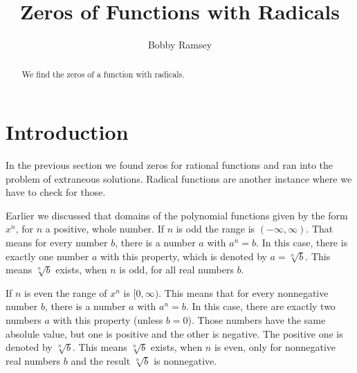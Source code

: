\documentclass[nooutcomes]{ximera}
\author{Bobby Ramsey}
\title{Zeros of Functions with Radicals}
\begin{document}
\begin{abstract}
 	We find the zeros of a function with radicals.
\end{abstract}
\maketitle




\section{Introduction}

	In the previous section we found zeros for rational functions and ran into the problem of extraneous solutions. 
	Radical functions are another instance where we have to check for those.

	\begin{callout}
		Earlier we discussed that domains of the polynomial functions given by the form $x^n$, for $n$ a positive, whole number.
		If $n$ is odd the range is $(-\infty, \infty)$. That means for every number $b$, there is a number $a$ with $a^n = b$. In this case,
		there is exactly one number $a$ with this property, which is denoted by $a = \sqrt[n]{b}$. This means $\sqrt[n]{b}$ exists, when $n$ is odd,
		for all real numbers $b$.
		
		If $n$ is even the range of $x^n$ is $[0, \infty)$. This means that for every nonnegative number $b$, there is a number $a$ with $a^n = b$. 
		In this case, there are exactly two numbers $a$ with this property (unless $b=0$). Those numbers have the same absolule value, but one is positive 
		and the other is negative. The positive one is denoted by $\sqrt[n]{b}$. This means $\sqrt[n]{b}$ exists, when $n$ is even, only for nonnegative real 
		numbers $b$ and the result $\sqrt[n]{b}$ is nonnegative.
	\end{callout}	
\end{document}
